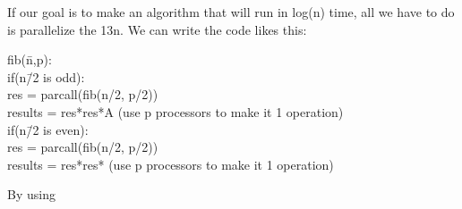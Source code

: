 \documentclass{article}
\begin{document}
\begin{enumerate}
If our goal is to make an algorithm that will run in log(n) time, all we have to do is parallelize the 13n. We can write the code likes this:
\begin{tabbing}
fib(\=n,p):\\
\>if(n\=/2 is odd):\\
\>\>res = parcall(fib(n/2, p/2))\\
\>\>results = res*res*A (use p processors to make it 1 operation) \\
\>if(n\=/2 is even):\\
\>\>res = parcall(fib(n/2, p/2))\\
\>\>results = res*res* (use p processors to make it 1 operation) \\
\end{tabbing}
By using 
\end{enumerate}
\end{document}
